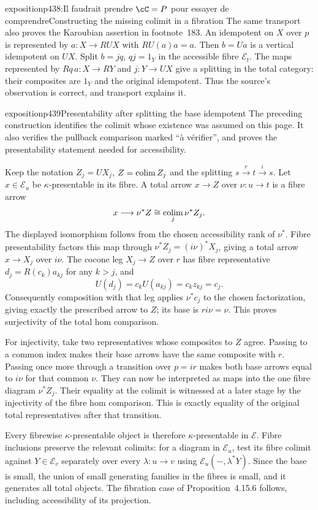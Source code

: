 \begin{dcomment}{exposition}{p438:Il faudrait prendre $\cC = P$ pour essayer de comprendre}{Constructing the missing colimit in a fibration}
The same transport also proves the Karoubian assertion in footnote~183. An idempotent on $X$ over $p$ is represented by $a:X\to RUX$ with $RU(a)a=a$. Then $b=Ua$ is a vertical idempotent on $UX$. Split $b=jq$, $qj=1_Y$ in the accessible fibre $\mathcal E_t$. The maps represented by $Rq\,a:X\to RY$ and $j:Y\to UX$ give a splitting in the total category: their composites are $1_Y$ and the original idempotent. Thus the source's observation is correct, and transport explains it.
\end{dcomment}

\begin{dcomment}{exposition}{p439}{Presentability after splitting the base idempotent}
The preceding construction identifies the colimit whose existence was assumed on this page. It also verifies the pullback comparison marked ``\`a v\'erifier'', and proves the presentability statement needed for accessibility.

Keep the notation $Z_j=UX_j$, $Z=\mathop{\rm colim}Z_j$ and the splitting $s\xrightarrow r t\xrightarrow i s$. Let $x\in\mathcal E_u$ be $\kappa$-presentable in its fibre. A total arrow $x\to Z$ over $\nu:u\to t$ is a fibre arrow
\[
 x\longrightarrow\nu^*Z
       \cong\mathop{\rm colim}_j\nu^*Z_j.
\]
The displayed isomorphism follows from the chosen accessibility rank of $\nu^*$. Fibre presentability factors this map through $\nu^*Z_j=(i\nu)^*X_j$, giving a total arrow $x\to X_j$ over $i\nu$. The cocone leg $X_j\to Z$ over $r$ has fibre representative $d_j=R(c_k)a_{kj}$ for any $k>j$, and
\[
 U(d_j)=c_kU(a_{kj})=c_kz_{kj}=c_j.
\]
Consequently composition with that leg applies $\nu^*c_j$ to the chosen factorization, giving exactly the prescribed arrow to $Z$; its base is $ri\nu=\nu$. This proves surjectivity of the total hom comparison.

For injectivity, take two representatives whose composites to $Z$ agree. Passing to a common index makes their base arrows have the same composite with $r$. Passing once more through a transition over $p=ir$ makes both base arrows equal to $i\nu$ for that common $\nu$. They can now be interpreted as maps into the one fibre diagram $\nu^*Z_j$. Their equality at the colimit is witnessed at a later stage by the injectivity of the fibre hom comparison. This is exactly equality of the original total representatives after that transition.

Every fibrewise $\kappa$-presentable object is therefore $\kappa$-presentable in $\mathcal E$. Fibre inclusions preserve the relevant colimits: for a diagram in $\mathcal E_u$, test its fibre colimit against $Y\in\mathcal E_v$ separately over every $\lambda:u\to v$ using $\mathcal E_u(-,\lambda^*Y)$. Since the base is small, the union of small generating families in the fibres is small, and it generates all total objects. The fibration case of Proposition~4.15.6 follows, including accessibility of its projection.


\end{dcomment}
